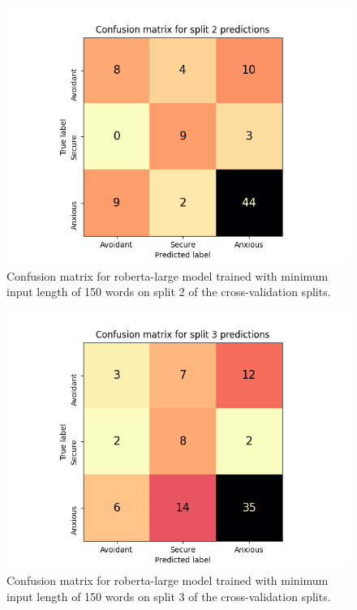 \documentclass[12pt]{report}
\begin{document}
\begin{figure}
    \includegraphics[width=\textwidth]{figures/roberta-large_150_split2_confusion_matrix.png}
    \caption{Confusion matrix for roberta-large model trained with minimum input length of 150 words on split 2 of the cross-validation splits.}
    \label{fig: cm split2}
\end{figure}

\begin{figure}
    \includegraphics[width=\textwidth]{figures/roberta-large_150_split3_confusion_matrix.png}
    \caption{Confusion matrix for roberta-large model trained with minimum input length of 150 words on split 3 of the cross-validation splits.}
    \label{fig: cm split3}
\end{figure}
\end{document}

